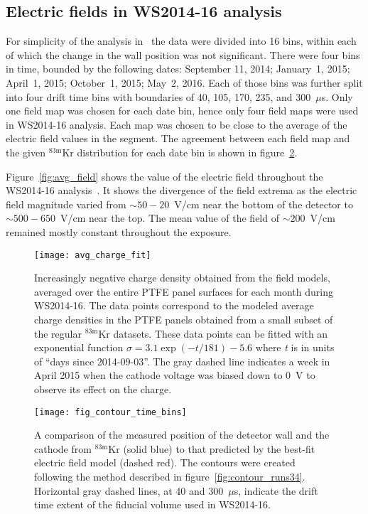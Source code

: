\documentclass[11pt,a4paper]{article}
\newcommand{\isot}[2]{$^{\textrm{#2}}$#1 }
\newcommand{\krm}{\isot{Kr}{83m}}
\begin{document}
\subsection{Electric fields in WS2014-16 analysis}
For simplicity of the analysis in~\cite{Akerib:2016vxi} the data were divided into 16 bins, within each of which the change in the wall position was not significant. There were four bins in time, bounded by the following dates: September 11, 2014; January~1, 2015; April~1, 2015; October~1, 2015; May~2, 2016. Each of those bins was further split into four drift time bins with boundaries of 40, 105, 170, 235, and 300~$\mu$s. Only one field map was chosen for each date bin, hence only four field maps were used in WS2014-16 analysis. Each map was chosen to be close to the average of the electric field values in the segment. The agreement between each field map and the given \krm distribution for each date bin is shown in figure~\ref{fig:contour_time_bins}.

Figure~\ref{fig:avg_field} shows the value of the electric field throughout the WS2014-16 analysis~\cite{Akerib:2016vxi}. It shows the divergence of the field extrema as the electric field magnitude varied from $\sim50-20$~V/cm near the bottom of the detector to $\sim500-650$~V/cm near the top. The mean value of the field of $\sim200$~V/cm remained mostly constant throughout the exposure.

\begin{figure}[ht!]
\begin{center}
\texttt{[image: avg\_charge\_fit]}
\caption{Increasingly negative charge density obtained from the field models, averaged over the entire PTFE panel surfaces for each month during WS2014-16. The data points correspond to the modeled average charge densities in the PTFE panels obtained from a small subset of the regular \krm datasets. These data points can be fitted with an exponential function $\sigma=3.1\exp(-t/181)-5.6$ where \textit{t} is in units of ``days since 2014-09-03''. The gray dashed line indicates a week in April 2015 when the cathode voltage was biased down to 0~V to observe its effect on the charge.}
\label{fig:avg_charge_fit}
\end{center} 
\end{figure}

\begin{figure}[h!]
\begin{center}
\texttt{[image: fig\_contour\_time\_bins]}
\caption{A comparison of the measured position of the detector wall and the cathode from \krm (solid blue) to that predicted by the best-fit electric field model (dashed red). The contours were created following the method described in figure~\ref{fig:contour_runs34}. Horizontal gray dashed lines, at 40 and 300~$\mu$s, indicate the drift time extent of the fiducial volume used in WS2014-16.}
\label{fig:contour_time_bins}
\end{center} 
\end{figure}
\end{document}
